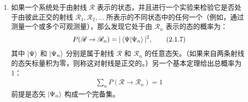 \begin{enumerate}
    \item[(iii)] 如果一个系统处于由射线 $\mathscr{R}$ 表示的状态，并且进行一个实验来检验它是否处于由彼此正交的射线 $\mathscr{R}_{1}, \mathscr{R}_{2}, \ldots$ 所表示的不同状态中的任何一个（例如，通过测量一个或多个可观测量），那么发现它处于由 $\mathscr{R}_{n}$ 表示的态的概率为：
        \begin{align}
            P(\mathscr{R} \rightarrow \mathscr{R}_{n}) = |\braket{\Psi | \Psi_{n}}|^{2}, \tag{2.1.7}
        \end{align}
        其中 $\ket{\Psi}$ 和 $\ket{\Psi_{n}}$ 分别是属于射线 $\mathscr{R}$ 和 $\mathscr{R}_{n}$ 的任意态矢。（如果来自两条射线的态矢标量积为零，则称这对射线是正交的。）另一个基本定理给出总概率为 1：
        \begin{align}
            \sum_{n} P(\mathscr{R} \rightarrow \mathscr{R}_{n}) = 1 \tag{2.1.8}
        \end{align}
        前提是态矢 $\ket{\Psi_{n}}$ 构成一个完备集。
\end{enumerate}
